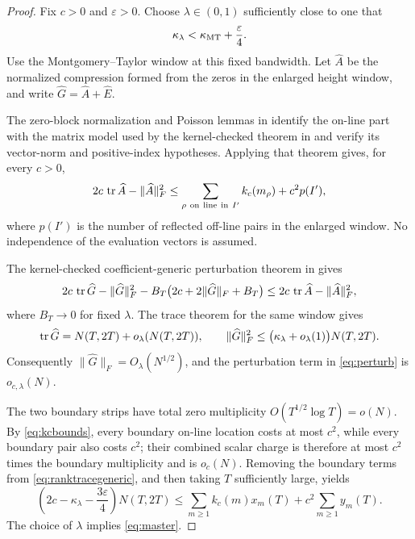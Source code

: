 \begin{proof}
Fix $c>0$ and $\varepsilon>0$.  Choose $\lambda\in(0,1)$ sufficiently close to one that
\[
\kappa_\lambda<\kappa_{\mathrm{MT}}+\frac{\varepsilon}{4}.
\]
Use the Montgomery--Taylor window at this fixed bandwidth.  Let $\widehat A$ be the normalized compression formed from the zeros in the enlarged height window, and write $\widehat G=\widehat A+\widehat E$.

The zero-block normalization and Poisson lemmas in
 identify the on-line part with the matrix model used by the
kernel-checked theorem  in
 and verify its vector-norm and positive-index hypotheses.  Applying that theorem gives, for every $c>0$,
\begin{equation}\label{eq:ranktracegeneric}
2c\,\operatorname{tr}\widehat A-\|\widehat A\|_F^2
\leq
\sum_{\rho\ \mathrm{on\ line\ in}\ I'}k_c(m_\rho)+c^2p(I'),
\end{equation}
where $p(I')$ is the number of reflected off-line pairs in the enlarged window.  No independence of the evaluation vectors is assumed.

The kernel-checked coefficient-generic perturbation theorem  in  gives
\begin{equation}\label{eq:perturb}
2c\,\operatorname{tr}\widehat G-\|\widehat G\|_F^2
-B_T\bigl(2c+2\|\widehat G\|_F+B_T\bigr)
\leq
2c\,\operatorname{tr}\widehat A-\|\widehat A\|_F^2,
\end{equation}
where $B_T\to0$ for fixed $\lambda$.  The trace theorem for the same window gives
\[
\operatorname{tr}\widehat G=N(T,2T)+o_\lambda(N(T,2T)),
\qquad
\|\widehat G\|_F^2\leq
\bigl(\kappa_\lambda+o_\lambda(1)\bigr)N(T,2T).
\]
Consequently $\|\widehat G\|_F=O_\lambda(N^{1/2})$, and the perturbation term in \eqref{eq:perturb} is $o_{c,\lambda}(N)$.

The two boundary strips have total zero multiplicity $O(T^{1/2}\log T)=o(N)$.  By \eqref{eq:kcbounds}, every boundary on-line location costs at most $c^2$, while every boundary pair also costs $c^2$; their combined scalar charge is therefore at most $c^2$ times the boundary multiplicity and is $o_c(N)$.  Removing the boundary terms from \eqref{eq:ranktracegeneric}, and then taking $T$ sufficiently large, yields
\[
\left(2c-\kappa_\lambda-\frac{3\varepsilon}{4}\right)N(T,2T)
\leq
\sum_{m\geq1}k_c(m)x_m(T)+c^2\sum_{m\geq1}y_m(T).
\]
The choice of $\lambda$ implies \eqref{eq:master}.
\end{proof}

